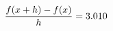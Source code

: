 \documentclass[preview]{standalone}
\begin{document}
\begin{align*}
\special{dvisvgm:raw <g id='unique000'>}\frac{f(x+h)-f(x)}{h} = 3.010\special{dvisvgm:raw </g>}
\end{align*}
\end{document}
